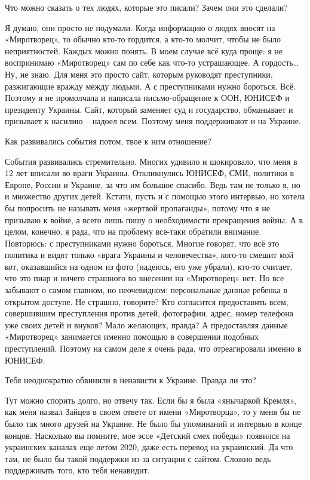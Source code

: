 Что можно сказать о тех людях, которые это писали? Зачем они это сделали?

Я думаю, они просто не подумали. Когда информацию о людях вносят на
«Миротворец», то обычно кто-то гордится, а кто-то молчит, чтобы не было
неприятностей. Каждых можно понять. В моем случае всё куда проще: я не
воспринимаю «Миротворец» сам по себе как что-то устрашающее. А гордость… Ну, не
знаю. Для меня это просто сайт, которым руководят преступники, разжигающие
вражду между людьми. А с преступниками нужно бороться. Всё. Поэтому я не
промолчала и написала письмо-обращение к ООН, ЮНИСЕФ и президенту Украины.
Сайт, который заменяет суд и государство, обманывает и призывает к насилию –
надоел всем. Поэтому меня поддерживают и на Украине.

Как развивались события потом, твое к ним отношение?

События развивались стремительно. Многих удивило и шокировало, что меня в 12
лет вписали во враги Украины. Откликнулись ЮНИСЕФ, СМИ, политики в Европе,
России и Украине, за что им большое спасибо. Ведь там не только я, но и
множество других детей. Кстати, пусть и с помощью этого интервью, но хотела бы
попросить не называть меня «жертвой пропаганды», потому что я не призываю к
войне, а всего лишь пишу о необходимости прекращения войны. А в целом, конечно,
я рада, что на проблему все-таки обратили внимание. Повторюсь: с преступниками
нужно бороться. Многие говорят, что всё это политика и видят только «врага
Украины и человечества», кого-то смешит мой кот, оказавшийся на одном из фото
(надеюсь, его уже убрали), кто-то считает, что это пиар и ничего страшного во
внесении на «Миротворец» нет. Но все забывают о самом главном, но неочевидном:
персональные данные ребенка в открытом доступе. Не страшно, говорите? Кто
согласится предоставить всем, совершившим преступления против детей,
фотографии, адрес, номер телефона уже своих детей и внуков? Мало желающих,
правда? А предоставляя данные «Миротворец» занимается именно помощью в
совершении подобных преступлений. Поэтому на самом деле я очень рада, что
отреагировали именно в ЮНИСЕФ.

Тебя неоднократно обвинили в ненависти к Украине. Правда ли это?

Тут можно спорить долго, но отвечу так. Если бы я была «янычаркой Кремля», как
меня назвал Зайцев в своем ответе от имени «Миротворца», то у меня бы не было
так много друзей на Украине. Не было бы упоминаний и интервью в конце концов.
Насколько вы помните, мое эссе «Детский смех победы» появился на украинских
каналах еще летом 2020, даже есть перевод на украинский. Да что там, не было бы
такой поддержки из-за ситуации с сайтом. Сложно ведь поддерживать того, кто
тебя ненавидит.

